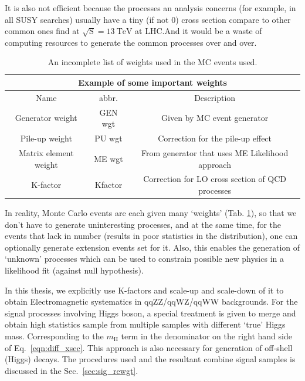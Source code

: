 It is also not efficient because the processes an analysis concerns (for example, in all SUSY
searches) usually have a tiny (if not 0) cross section compare to other common ones find at
$\sqrt{\mathrm{S}} = \SI{13}{\tera\electronvolt}$ at LHC.\@ And it would be a waste of
computing resources to generate the common processes over and over.

\begin{table}[]
\centering
\begin{tabular}{|c|c|c|}
\hline
\multicolumn{3}{|c|}{Example of some important weights}                                                                                       \\ \hline
Name                  & abbr.   & Description                                                                                                 \\ \hline
Generator weight      & GEN wgt & Given by MC event generator                                                                                 \\ \hline
Pile-up weight        & PU wgt  & Correction for the pile-up effect                                                                           \\ \hline
Matrix element weight & ME wgt  & From generator that uses ME Likelihood approach \\ \hline
K-factor              & Kfactor & Correction for LO cross section of QCD processes                                                         \\ \hline
\end{tabular}
\caption{An incomplete list of weights used in the MC events used.}
\label{tab:MC_wgts}
\end{table}

In reality, Monte Carlo events are each given many `weights' (Tab. \ref{tab:MC_wgts}), so that
we don't have to generate uninteresting processes, and at the same time, for the events that lack
in number (results in poor statistics in the distribution), one can optionally generate
extension events set for it. Also, this enables the generation of `unknown' processes which can
be used to constrain possible new physics in a likelihood fit (against null hypothesis).

In this thesis, we explicitly use K-factors and scale-up and scale-down of it to 
obtain Electromagnetic systematics in qqZZ/qqWZ/qqWW backgrounds. For the signal processes involving
Higgs boson, a special treatment is given to merge and obtain high statistics sample from
multiple samples with different `true' Higgs mass. Corresponding to the $m_\mathrm{H}$ term
in the denominator on the right hand side of Eq.~\ref{eqn:diff_xsec}.
This approach is also necessary for generation of off-shell (Higgs) decays. The procedures 
used and the resultant combine signal samples is discussed in the Sec.~\ref{sec:sig_rewgt}.
